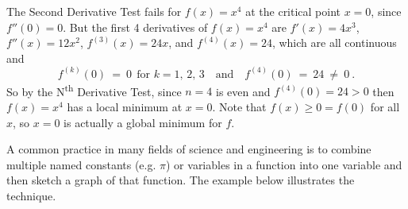 \begin{exmp}\label{exmp:graph4}
The Second Derivative Test fails for $f(x)=x^4$ at the critical point $x=0$,
since $f''(0)=0$. But the first 4 derivatives of $f(x)=x^4$ are $f'(x)=4x^3$,
$f''(x)=12x^2$, $f^{(3)}(x)=24x$, and $f^{(4)}(x)=24$, which are all continuous
and
\[
f^{(k)}(0) ~=~ 0 ~~\text{for $k=1$, $2$, $3$}
\quad\text{and}\quad f^{(4)}(0) ~=~ 24 ~\ne~ 0 ~.
\]
So by the
N\textsuperscript{th} Derivative Test, since $n=4$ is even and $f^{(4)}(0)=24>0$
then $f(x)=x^4$ has a local minimum at $x=0$. Note that $f(x) \ge 0 = f(0)$ for
all $x$, so $x = 0$ is actually a global minimum for $f$.
\end{exmp}
\divider
\newpage
A common practice in many fields of science and engineering is to combine
multiple named constants (e.g. $\pi$) or variables in a function into one
variable and then sketch a graph of that function. The example below illustrates
the technique.

